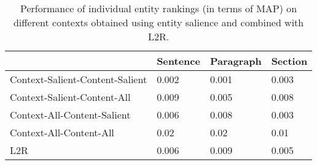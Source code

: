 \begin{table}[t]
\caption{Performance of individual entity rankings (in terms of MAP) on different contexts obtained using entity salience and combined with L2R.}
\label{tab:Results-Entity-Rankings-Sal}
\begin{tabular}{@{}llll@{}}
\toprule
                                & Sentence & Paragraph & Section \\ \midrule
Context-Salient-Content-Salient & 0.002    & 0.001     & 0.003   \\
Context-Salient-Content-All     & 0.009    & 0.005     & 0.008   \\
Context-All-Content-Salient     & 0.006    & 0.008     & 0.003   \\
Context-All-Content-All         & 0.02     & 0.02      & 0.01    \\ \midrule
L2R                             & 0.006    & 0.009     & 0.005   \\ \bottomrule
\end{tabular}
\end{table}